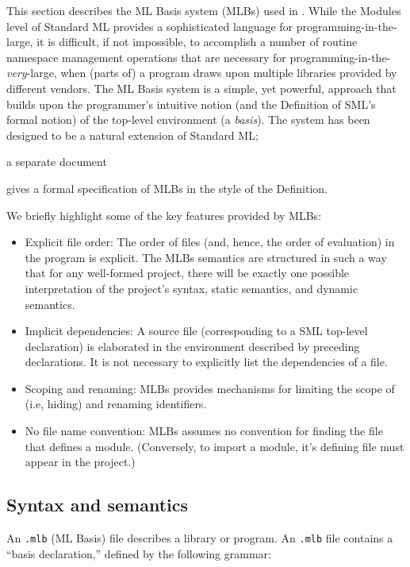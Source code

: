 %
This section describes the ML Basis system (MLBs) used in {\mlton}.
While the Modules level of Standard ML provides a sophisticated
language for programming-in-the-large, it is difficult, if not
impossible, to accomplish a number of routine namespace management
operations that are necessary for
programming-in-the-\emph{very}-large, when (parts of) a program draws
upon multiple libraries provided by different vendors.  The ML Basis
system is a simple, yet powerful, approach that builds upon the
programmer's intuitive notion (and the Definition of SML's formal
notion) of the top-level environment (a \emph{basis}).  The system has
been designed to be a natural extension of Standard ML;
\begin{latexonly}
\end{latexonly}
\begin{htmlonly}
a separate document
\end{htmlonly}
gives a formal specification of MLBs in the style of the Definition.

We briefly highlight some of the key features provided by MLBs:
\begin{itemize}
\item Explicit file order: The order of files (and, hence, the order
  of evaluation) in the program is explicit.  The MLBs semantics are
  structured in such a way that for any well-formed project, there
  will be exactly one possible interpretation of the project's syntax,
  static semantics, and dynamic semantics.
\item Implicit dependencies: A source file (corresponding to a SML
  top-level declaration) is elaborated in the environment described by
  preceding declarations.  It is not necessary to explicitly list the
  dependencies of a file.
\item Scoping and renaming: MLBs provides mechanisms for limiting the
  scope of (i.e, hiding) and renaming identifiers.
\item No file name convention: MLBs assumes no convention for finding
  the file that defines a module.  (Conversely, to import a module,
  it's defining file must appear in the project.)
\end{itemize}

%
\subsection{Syntax and semantics}

An {\tt .mlb} (ML Basis) file describes a library or program.  An
{\tt .mlb} file contains a ``basis declaration,'' defined by the
following grammar:

